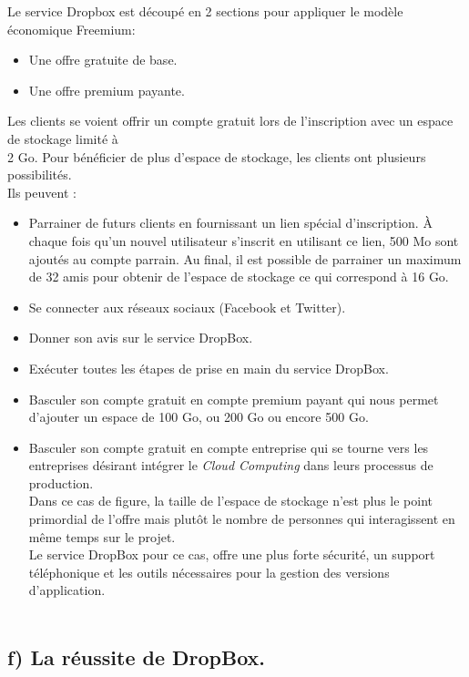 \documentclass[a4paper, 10pt]{article}
\begin{document}
Le service Dropbox est découpé en 2 sections pour appliquer le modèle économique Freemium:
\begin{itemize}
 \item Une offre gratuite de base.
 \item Une offre premium payante.\\
\end{itemize}
Les clients se voient offrir un compte gratuit lors de l'inscription avec un espace de stockage limité à\\2 Go.
Pour bénéficier de plus d'espace de stockage, les clients ont plusieurs possibilités.\\
Ils peuvent :
\begin{itemize}
 \item Parrainer de futurs clients en fournissant un lien spécial d'inscription.
À chaque fois qu'un nouvel utilisateur s'inscrit en utilisant ce lien, 500 Mo sont ajoutés au compte parrain.
Au final, il est possible de parrainer un maximum de 32 amis pour obtenir de l'espace de stockage ce qui correspond à 16 Go.
 \item Se connecter aux réseaux sociaux (Facebook et Twitter).
 \item Donner son avis sur le service DropBox.
 \item Exécuter toutes les étapes de prise en main du service DropBox.
 \item Basculer son compte gratuit en compte premium payant qui nous permet d'ajouter un espace de 100 Go, ou 200 Go ou encore 500 Go.
 \item Basculer son compte gratuit en compte entreprise qui se tourne vers les entreprises désirant intégrer le \textit{Cloud Computing}
dans leurs processus de production.\\
Dans ce cas de figure, la taille de l'espace de stockage n'est plus le point primordial de l'offre mais
plutôt le nombre de personnes qui interagissent en même temps sur le projet.\\
Le service DropBox pour ce cas, offre une plus forte sécurité,
un support téléphonique et les outils nécessaires pour la gestion des versions d'application.\\ \\
\end{itemize}

\subsection*{f) La réussite de DropBox.}
\indent
\end{document}
